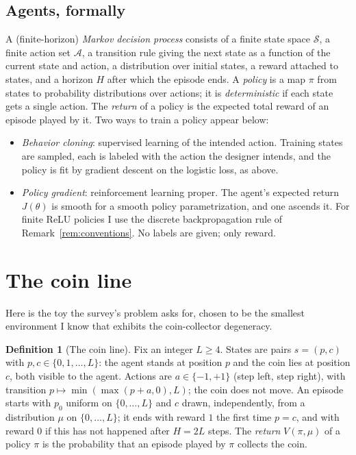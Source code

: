 \documentclass[11pt]{amsart}
\theoremstyle{plain}
\theoremstyle{definition}
\newtheorem{definition}[theorem]{Definition}
\begin{document}
\subsection{Agents, formally}
A (finite-horizon) \emph{Markov decision process} consists of a finite state space $\mathcal S$, a finite action set $\mathcal A$, a transition rule giving the next state as a function of the current state and action, a distribution over initial states, a reward attached to states, and a horizon $H$ after which the episode ends. A \emph{policy} is a map $\pi$ from states to probability distributions over actions; it is \emph{deterministic} if each state gets a single action. The \emph{return} of a policy is the expected total reward of an episode played by it. Two ways to train a policy appear below:
\begin{itemize}
\item \emph{Behavior cloning}: supervised learning of the intended action. Training states are sampled, each is labeled with the action the designer intends, and the policy is fit by gradient descent on the logistic loss, as above.
\item \emph{Policy gradient}: reinforcement learning proper. The agent's expected return $J(\theta)$ is smooth for a smooth policy parametrization, and one ascends it. For finite ReLU policies I use the discrete backpropagation rule of Remark~\ref{rem:conventions}. No labels are given; only reward.
\end{itemize}

\section{The coin line}\label{sec:coinline}

Here is the toy the survey's problem asks for, chosen to be the smallest environment I know that exhibits the coin-collector degeneracy.

\begin{definition}[The coin line]\label{def:coinline}
Fix an integer $L\ge4$. States are pairs $s=(p,c)$ with $p,c\in\{0,1,\dots,L\}$: the agent stands at position $p$ and the coin lies at position $c$, both visible to the agent. Actions are $a\in\{-1,+1\}$ (step left, step right), with transition $p\mapsto \min(\max(p+a,0),L)$; the coin does not move. An episode starts with $p_0$ uniform on $\{0,\dots,L\}$ and $c$ drawn, independently, from a distribution $\mu$ on $\{0,\dots,L\}$; it ends with reward $1$ the first time $p=c$, and with reward $0$ if this has not happened after $H=2L$ steps. The \emph{return} $V(\pi,\mu)$ of a policy $\pi$ is the probability that an episode played by $\pi$ collects the coin.
\end{definition}
\end{document}
